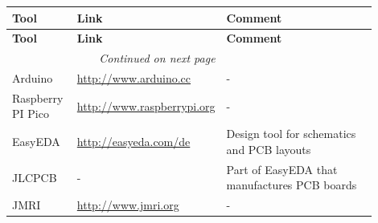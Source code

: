\begin{longtable}{|p{0.18\linewidth}|p{0.26\linewidth}|p{0.46\linewidth}|}
    \toprule
    \textbf{Tool} & \textbf{Link} & \textbf{Comment} \\
    \midrule
    \endfirsthead
    \toprule
    \textbf{Tool} & \textbf{Link} & \textbf{Comment} \\
    \midrule
    \endhead
    \midrule
    \multicolumn{2}{r}{\textit{Continued on next page}} \\
    \midrule
    \endfoot
    \bottomrule
    \endlastfoot
    Arduino & \url{http://www.arduino.cc} & - \\
	\midrule
	Raspberry PI Pico & \url{http://www.raspberrypi.org} & - \\
	\midrule
	EasyEDA & \url{http://easyeda.com/de} & Design tool for schematics and PCB layouts \\
	\midrule
	JLCPCB & - & Part of EasyEDA that manufactures PCB boards \\
	\midrule
	JMRI & \url{http://www.jmri.org} & - \\
\end{longtable}

